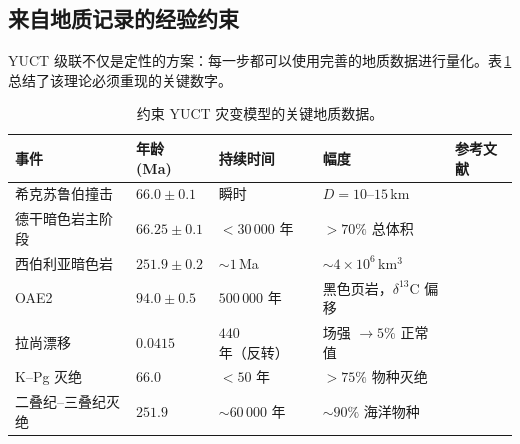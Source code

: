 \documentclass[11pt,a4paper]{article}
\begin{document}
	\subsection{来自地质记录的经验约束}
	
	YUCT 级联不仅是定性的方案：每一步都可以使用完善的地质数据进行量化。表 \ref{tab:geodata} 总结了该理论必须重现的关键数字。
	
	\begin{table}[H]
		\centering
		\small
		\caption{约束 YUCT 灾变模型的关键地质数据。}
		\label{tab:geodata}
		\begin{tabular}{@{}p{4.2cm} p{2.6cm} p{2.8cm} p{4.2cm} p{1.2cm}@{}}
			\toprule
			\textbf{事件} & \textbf{年龄 (Ma)} & \textbf{持续时间} & \textbf{幅度} & \textbf{参考文献} \\
			\midrule
			希克苏鲁伯撞击 & \(66.0 \pm 0.1\) & 瞬时 & \(D = 10\)–\(15\) km & \cite{Schulte2010} \\
			德干暗色岩主阶段 & \(66.25 \pm 0.1\) & \(<30\,000\) 年 & \(>70\%\) 总体积 & \cite{Schoene2019} \\
			西伯利亚暗色岩 & \(251.9 \pm 0.2\) & \(\sim 1\) Ma & \(\sim 4\times10^6\) km\(^3\) & \cite{SiberianTraps} \\
			OAE2 & \(94.0 \pm 0.5\) & \(500\,000\) 年 & 黑色页岩，\(\delta^{13}\)C 偏移 & \cite{Jenkyns2010} \\
			拉尚漂移 & \(0.0415\) & \(440\) 年（反转） & 场强 \(\to 5\%\) 正常值 & \cite{Laschamp} \\
			K–Pg 灭绝 & \(66.0\) & \(<50\) 年 & \(>75\%\) 物种灭绝 & \cite{Schulte2010} \\
			二叠纪–三叠纪灭绝 & \(251.9\) & \(\sim 60\,000\) 年 & \(\sim 90\%\) 海洋物种 & \cite{Burgess2014} \\
			\bottomrule
		\end{tabular}
	\end{table}
	
\end{document}
